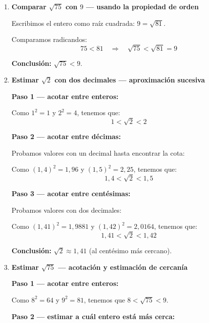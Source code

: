 \documentclass[11pt, letterpaper]{article}
\begin{document}
\begin{tcolorbox}[examplebox, title={Ejemplos}]
\begin{enumerate}[label=\textbf{Ej. \arabic*.}, leftmargin=*, itemsep=18pt]
Queremos determinar si $\sqrt{50}$ es mayor o menor que $7$, sin calcular decimales.

\medskip
Escribimos el entero como raíz cuadrada: $7 = \sqrt{49}$.

Ahora la comparación se reduce a comparar los radicandos:
$$50 > 49 \quad\Longrightarrow\quad \sqrt{50} > \sqrt{49} = 7$$

\textbf{Conclusión:} $\sqrt{50} > 7$.

\item \textbf{Comparar $\sqrt{75}$ con $9$ — usando la propiedad de orden}

Escribimos el entero como raíz cuadrada: $9 = \sqrt{81}$.

Comparamos radicandos:
$$75 < 81 \quad\Longrightarrow\quad \sqrt{75} < \sqrt{81} = 9$$

\textbf{Conclusión:} $\sqrt{75} < 9$.

\item \textbf{Estimar $\sqrt{2}$ con dos decimales — aproximación sucesiva}

\medskip
\textbf{Paso 1 — acotar entre enteros:}

Como $1^2 = 1$ y $2^2 = 4$, tenemos que:
$$1 < \sqrt{2} < 2$$

\medskip
\textbf{Paso 2 — acotar entre décimas:}

Probamos valores con un decimal hasta encontrar la cota:

Como $(1{,}4)^2 = 1{,}96$ y $(1{,}5)^2 = 2{,}25$, tenemos que:
$$1{,}4 < \sqrt{2} < 1{,}5$$

\medskip
\textbf{Paso 3 — acotar entre centésimas:}

Probamos valores con dos decimales:

Como $(1{,}41)^2 = 1{,}9881$ y $(1{,}42)^2 = 2{,}0164$, tenemos que:
$$1{,}41 < \sqrt{2} < 1{,}42$$

\medskip
\textbf{Conclusión:} $\sqrt{2} \approx 1{,}41$ (al centésimo más cercano).

\item \textbf{Estimar $\sqrt{75}$ — acotación y estimación de cercanía}

\medskip
\textbf{Paso 1 — acotar entre enteros:}

Como $8^2 = 64$ y $9^2 = 81$, tenemos que $8 < \sqrt{75} < 9$.

\medskip
\textbf{Paso 2 — estimar a cuál entero está más cerca:}


\end{enumerate}
\end{tcolorbox}
\end{document}
